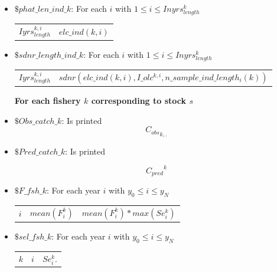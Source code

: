 \documentclass{article}
\begin{document}
\begin{itemize}
\begin{center}
\begin{tabular}{c c}
    \end{tabular}
\end{center}

\item $\$ phat\_len\_ind\_k$: For each $i$ with $1\leq i \leq Inyrs^k_{length}$
\begin{center}
    \begin{tabular}{c c}
       $Iyrs^{k,i}_{length}$  &  $elc\_ind(k,i)$\\
         
    \end{tabular}
\end{center}



\item $\$ sdnr\_length\_ind\_k$: For each $i$ with $1\leq i \leq Inyrs^k_{length}$
\begin{center}
    \begin{tabular}{c c}
       $Iyrs^{k,i}_{length}$  &  $sdnr( elc\_ind(k,i),I\_olc^{k,i},n\_sample\_ind\_length_i(k))$\\
         
    \end{tabular}
\end{center}
\textbf{For each fishery $k$ corresponding to stock $s$}\\

\item  $\$ Obs\_catch\_k$: Is printed 
\begin{equation*}
    {C_{obs}}_{k,.}
\end{equation*}
\item $\$ Pred\_catch\_k$: Is printed

\begin{equation*}
    {C_{pred}}^{k}
\end{equation*}

\item $\$ F\_fsh\_k$: For each year $i$ with $y_0 \leq  i \leq y_N$
\begin{center}
    \begin{tabular}{c c c }
      $i$   &  $mean(F^k_i)$ & $mean(F^k_i)*max(Se^k_i
      )$\\
\end{tabular}
\end{center}

\item $\$ sel\_fsh\_k$: For each year $i$ with $y_0 \leq  i \leq y_N$
\begin{center}
    \begin{tabular}{c c c }
    $k$   &  $i$ & $Se^k_i$.\\
\end{tabular}
\end{center}


\end{itemize}
\end{document}
